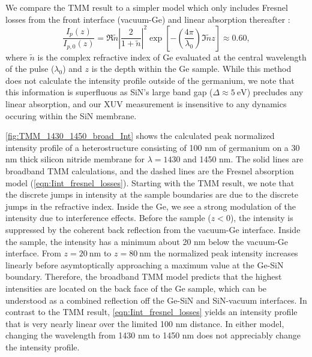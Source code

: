 We compare the TMM result to a simpler model which only includes Fresnel losses from the front interface (vacuum-Ge) and linear absorption thereafter \cite{zurchDirectSimultaneousObservation2017}:
\begin{equation}
\frac{I_p(z)}{I_{p,0}(z)} = \Re{\tilde{n}} \left| \frac{2}{1+\tilde{n}} \right|^2 \exp \left[ - \left( \frac{4 \pi}{\lambda_0} \right) \Im{\tilde{n}} z \right] \approx 0.60,
\label{eqn:Iint_fresnel_losses}
\end{equation}
where $\tilde{n}$ is the complex refractive index of Ge evaluated at the central wavelength of the pulse ($\lambda_0$) and $z$ is the depth within the Ge sample. While this method does not calculate the intensity profile outside of the germanium, we note that this information is superfluous as SiN's large band gap ($\Delta \approx 5 \ \textrm{eV}$) precludes any linear absorption, and our XUV measurement is insensitive to any dynamics occuring within the SiN membrane.

\cref{fig:TMM_1430_1450_broad_Int} shows the calculated peak normalized intensity profile of a heterostructure consisting of 100 nm of germanium on a 30 nm thick silicon nitride membrane for $\lambda = 1430$ and 1450 nm. The solid lines are broadband TMM calculations, and the dashed lines are the Fresnel absorption model (\cref{eqn:Iint_fresnel_losses}). Starting with the TMM result, we note that the discrete jumps in intensity at the sample boundaries are due to the discrete jumps in the refractive index. Inside the Ge, we see a strong modulation of the intensity due to interference effects. Before the sample ($z < 0$), the intensity is suppressed by the coherent back reflection from the vacuum-Ge interface. Inside the sample, the intensity has a minimum about 20 nm below the vacuum-Ge interface. From $z=20 \ \textrm{nm}$ to $z=80 \ \textrm{nm}$ the normalized peak intensity increases linearly before asymtoptically approaching a maximum value at the Ge-SiN boundary. Therefore, the broadband TMM model predicts that the highest intensities are located on the back face of the Ge sample, which can be understood as a combined reflection off the Ge-SiN and SiN-vacuum interfaces. In contrast to the TMM result, \cref{eqn:Iint_fresnel_losses} yields an intensity profile that is very nearly linear over the limited 100 nm distance. In either model, changing the wavelength from 1430 nm to 1450 nm does not appreciably change the intensity profile.

